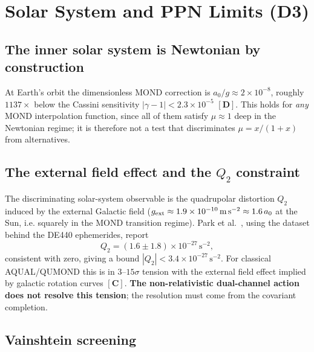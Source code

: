 \documentclass[aps,prd,preprint,superscriptaddress,nofootinbib,amsmath,amssymb,floatfix]{revtex4-2}
\begin{document}
\section{Solar System and PPN Limits (D3)}
\label{sec:solar}

\subsection{The inner solar system is Newtonian by construction}

At Earth's orbit the dimensionless MOND correction is $a_0/g \approx 2\times10^{-8}$, roughly $1137\times$ below the Cassini sensitivity $|\gamma-1| < 2.3\times10^{-5}$ $\mathbf{[D]}$. This holds for \emph{any} MOND interpolation function, since all of them satisfy $\mu\approx1$ deep in the Newtonian regime; it is therefore not a test that discriminates $\mu = x/(1+x)$ from alternatives.

\subsection{The external field effect and the $Q_2$ constraint}

The discriminating solar-system observable is the quadrupolar distortion $Q_2$ induced by the external Galactic field ($g_{\text{ext}} \approx 1.9\times10^{-10}\,\text{m\,s}^{-2} \approx 1.6\,a_0$ at the Sun, i.e. squarely in the MOND transition regime). Park et al.~\cite{Park2026}, using the dataset behind the DE440 ephemerides, report
\begin{equation}
Q_2 = (1.6 \pm 1.8)\times10^{-27}\,\text{s}^{-2},
\end{equation}
consistent with zero, giving a bound $|Q_2| < 3.4\times10^{-27}\,\text{s}^{-2}$. For classical AQUAL/QUMOND this is in $3$--$15\sigma$ tension with the external field effect implied by galactic rotation curves $\mathbf{[C]}$. \textbf{The non-relativistic dual-channel action does not resolve this tension}; the resolution must come from the covariant completion.

\subsection{Vainshtein screening}
\end{document}
